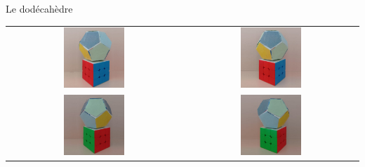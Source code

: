 \begin{frame}{Le dodécahèdre}
\begin{minipage}{0.40\textwidth}
\begin{tabular}{cc}
        \includegraphics[width=0.36\textwidth]{capture/dodecf4.jpg} &
        \includegraphics[width=0.36\textwidth]{capture/dodecf5.jpg} \\
        \includegraphics[width=0.36\textwidth]{capture/dodecf6.jpg} &
        \includegraphics[width=0.36\textwidth]{capture/dodecf7.jpg} \\
    \end{tabular}
\end{minipage}%
\hfill
\begin{minipage}{0.60\textwidth}
    \centering
    \setlength{\tabcolsep}{0pt}
    \renewcommand{\arraystretch}{0}
    \begin{tabular}{c}

\end{tabular}
\end{minipage}
\end{frame}
